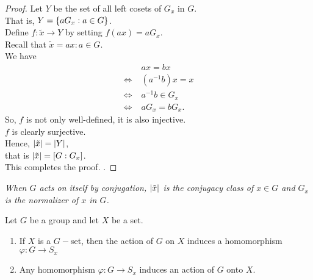 \documentclass[../main-sheet.tex]{subfiles}
\begin{document}
\begin{proof}
    Let \(Y\) be the set of all left cosets of \(G_x\) in \(G\).\\
    That is, \(Y = \left\{aG_x: a \in G\right\}\).\\
    Define \(f: \tilde{x} \to Y \) by setting \(f(ax) = aG_x\).\\
    Recall that \(\tilde{x} = {ax: a \in G}\).\\
    We have
    \begin{align*}
        &ax = bx\\
        \Leftrightarrow\;& (a^{-1}b)x = x\\
        \Leftrightarrow\;& a^{-1} b \in G_x\\
        \Leftrightarrow\;& aG_x = bG_x.
    \end{align*}
    So, \(f\) is not only well-defined, it is also injective.\\
    \(f\) is clearly surjective.\\
    Hence, \(\left\vert\tilde{x}\right\vert = \left\vert Y\right\vert\),\\
    that is \(\left\vert\tilde{x}\right\vert = [G: G_x]\).\\
    This completes the proof. .
\end{proof}
\emph{When \(G\) acts on itself by conjugation, \(\left\vert\tilde{x}\right\vert\) is the conjugacy class of \(x \in G\) and \(G_x\) is the normalizer of \(x\) in \(G\).}
\begin{thm}
    Let \(G\) be a group and let \(X\) be a set.
    \begin{enumerate}[label=(\roman*)]
        \item If \(X\) is a \(G-\)set, then the action of \(G\) on \(X\) induces a homomorphism \(\varphi : G\to S_x\)
        \item Any homomorphism \(\varphi : G\to S_x\) induces an action of \(G\) onto \(X\).
    \end{enumerate}
\end{thm}
\end{document}
